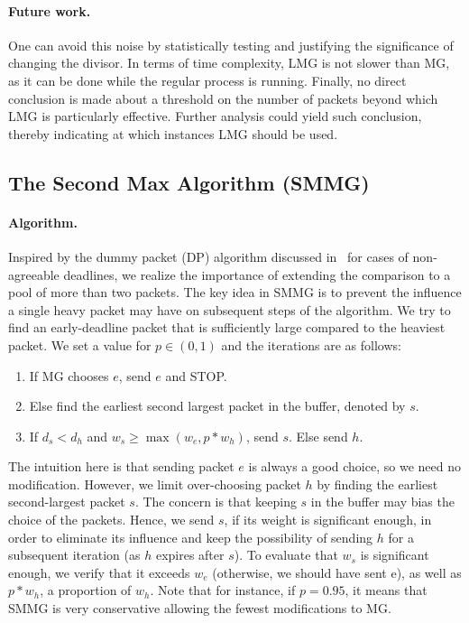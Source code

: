 \documentclass[oribibl]{llncs}
\begin{document}
\paragraph{Future work.} One can avoid this noise by statistically testing and justifying the significance of changing the divisor. In terms of time complexity, LMG is not slower than MG, as it can be done while the regular process is running. Finally, no direct conclusion is made about a threshold on the number of packets beyond which LMG is particularly effective. Further analysis could yield such conclusion, thereby indicating at which instances LMG should be used. 


\subsection {The Second Max Algorithm (SMMG)}
\paragraph{Algorithm.} Inspired by the dummy packet (DP) algorithm discussed in~\cite{li07} for cases of non-agreeable deadlines, we realize the importance of extending the comparison to a pool of more than two packets. The
key idea in SMMG is to prevent the influence a single heavy packet may have on
subsequent steps of the algorithm. We try to find an early-deadline
packet that is sufficiently large compared to the heaviest packet. We
set a value for $p \in (0,1)$ and the iterations are as follows: 



\begin {enumerate}
\item If MG chooses $e$, send $e$ and STOP.
\item Else find the earliest second largest packet in the buffer, denoted by $s$. 
\item If $d_s < d_h$ and $ w_s \geq \max(w_e, p*w_h)$, send $s$. Else send $h$.
\end {enumerate}

The intuition here is that sending packet $e$ is always a good choice, so we need no modification. However, we limit over-choosing packet $h$ by finding the earliest second-largest packet $s$. The concern is that keeping $s$ in the buffer may bias the choice of the packets. Hence, we send $s$, if its weight is significant enough, in order to eliminate its influence and keep the possibility of sending $h$ for a subsequent iteration (as $h$ expires after $s$). To evaluate that $w_s$ is significant enough, we verify that it exceeds $w_e$ (otherwise, we should have sent e), as well as $p*w_h$, a proportion of $w_h$. Note that for instance, if $p=0.95$, it means that SMMG is very conservative allowing the fewest modifications to MG.  
\end{document}
